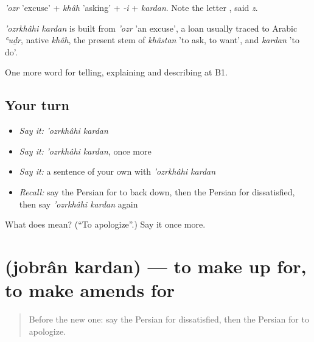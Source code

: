 \emph{'ozr} 'excuse' + \emph{khâh} 'asking' + \emph{-i} + \emph{kardan}. Note the letter , said \emph{z}.

\begin{cousinweb}
\emph{'ozrkhâhi kardan} is built from \emph{'ozr} 'an excuse', a loan usually traced to Arabic \emph{ʿuḏr}, native \emph{khâh}, the present stem of \emph{khâstan} 'to ask, to want', and \emph{kardan} 'to do'.
\end{cousinweb}

\begin{grammarlens}[title={What you've built}]
One more word for telling, explaining and describing at B1.
\end{grammarlens}

\subsection*{Your turn}
\begin{itemize}
\raggedright
  \item \emph{Say it:} \emph{'ozrkhâhi kardan}
  \item \emph{Say it:} \emph{'ozrkhâhi kardan}, once more
  \item \emph{Say it:} a sentence of your own with \emph{'ozrkhâhi kardan}
  \item \emph{Recall:} say the Persian for to back down, then the Persian for dissatisfied, then say \emph{'ozrkhâhi kardan} again
\end{itemize}

\begin{tcolorbox}[breakable,colback=teal!4,colframe=teal!35!black,title={Before you move on}]
What does   mean? (\textquotedblleft{}To apologize\textquotedblright{}.) Say it once more.
\end{tcolorbox}
\section[\texorpdfstring{\fa{جبران} \fa{کردن} (jobrân kardan)}{جبران کردن (jobrân kardan)}]{  (jobrân kardan) — to make up for, to make amends for}

\label{lesson:FA-C442-jobran-kardan}



\begin{quote}
Before the new one: say the Persian for dissatisfied, then the Persian for to apologize.
\end{quote}

